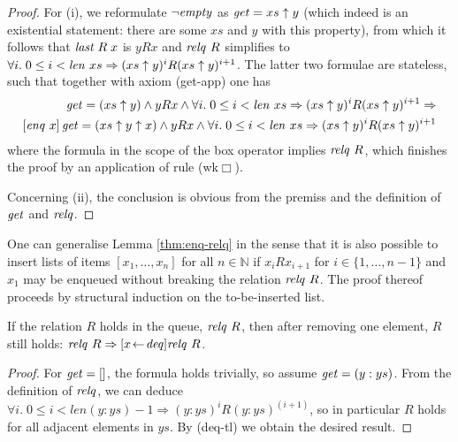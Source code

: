 \begin{proof} 
  For (i), we reformulate $\lnot \mathit{empty}$ as $\mathit{get} = xs\uparrow y$ (which indeed is an
  existential statement: there are some $xs$ and $y$ with this property), from
  which it follows that $\mathit{last}\;R\;x$ is $yRx$ and $\mathit{relq}\ R$ simplifies to 
  $\forall i.\; 0\leq i<\mathit{len}\ xs \Rightarrow (xs\uparrow y)^iR(xs\uparrow y)^{i+1}$. The latter two formulae
  are stateless, such that together with axiom (get-app) one has
  \begin{equation*}\begin{split}
 \get = (xs\uparrow y) \land yRx \land \forall i\bnd 0\leq i<\op{len}\ xs \Rightarrow (xs\uparrow y)^iR(xs\uparrow y)^{i+1} \Rightarrow \\
  \PDLBox{\enq\ x}{\get = (xs\uparrow y\uparrow x) \land yRx \land \forall i\bnd 0\leq i<\op{len}\ xs \Rightarrow (xs\uparrow
    y)^iR(xs\uparrow y)^{i+1}}
  \end{split}
  \end{equation*}
where the formula in the scope of the box operator implies $\mathit{relq}\ R$, which finishes
  the proof by an application of rule (wk$\Box$).


  Concerning (ii), the conclusion is obvious from the premiss and the definition
  of $\mathit{get}$ and $\mathit{relq}$.
\end{proof}


\begin{rem}
\label{rem:ext-enq-relq}
One can generalise Lemma \ref{thm:enq-relq} in the sense that it is also
possible to insert lists of items $[x_1,\ldots ,x_n]$ for all $n \in \mathbb{N}$ if
$x_i R x_{i+1}$ for $i \in \{1,\ldots,n-1 \}$ and $x_1$ may be enqueued without breaking
the relation $\mathit{relq}\ R$.  The proof thereof proceeds by
structural induction on the to-be-inserted list.
\end{rem}

\begin{lem}
\label{thm:relq-deq}
If the relation $R$ holds in the queue, \IE $\mathit{relq}\  R$, then after removing one
element, $R$ still holds: $\mathit{relq}\  R \Rightarrow [x\!\gets\!\mathit{deq}]\mathit{relq}\  R$. 
\end{lem}

\begin{proof}
For $\mathit{get} = []$, the formula holds trivially, so assume $\mathit{get} = (y: ys)$. From
the definition of $\mathit{relq}$, we can deduce $\forall i.\; 0\leq i<len (y: ys) - 1 \Rightarrow
(y: ys)^iR(y: ys)^{(i+1)}$, so in particular $R$ holds for all adjacent
elements in $ys$. By (deq-tl) we obtain the desired result.
\end{proof}


